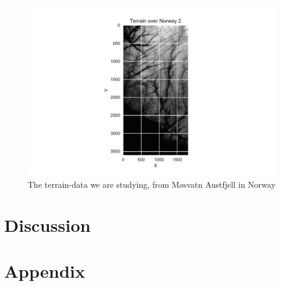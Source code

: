 \documentclass[a4paper,10pt,english]{article}
\begin{document}
\begin{figure}[h!]
	\centering 
	\includegraphics[scale=0.9]{../results/part_g_input.pdf}
	\caption{The terrain-data we are studying, from Møsvatn Austfjell in Norway}
	\label{part_g_input}
\end{figure}





\section{Discussion}
\label{sec:discussion}

\newpage

\section{Appendix}
\label{sec:appendix}
	
\end{document}
